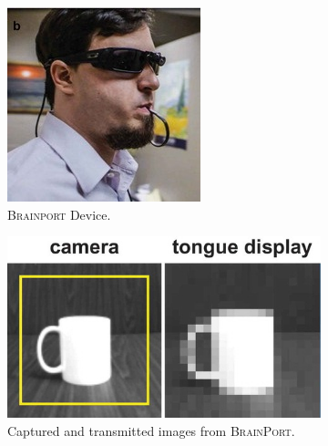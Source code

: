\documentclass[
hidelinks,
12pt, %
oneside, %
english, %
doublespacing, %
headsepline, %
]{MastersDoctoralThesis} %
\begin{document}
\begin{figure}[th]
	\centering
  \begin{subfigure}[b]{0.4\textwidth}
    \includegraphics[height=0.75\textwidth]{images/Brainport}
		\decoRule
    \caption[\textsc{BrainPort} Device]{\textsc{Brainport} Device.}
    \label{fig:bp1}
  \end{subfigure}
  \begin{subfigure}[b]{0.4\textwidth}
    \includegraphics[height=0.75\textwidth]{images/Brainport2}
		\decoRule
    \caption[\textsc{BrainPort} images]{Captured and transmitted images from \textsc{BrainPort}.}
    \label{fig:bp2}
  \end{subfigure}
	\caption[\textsc{BrainPort} implementation]{}
\end{figure}
\end{document}
